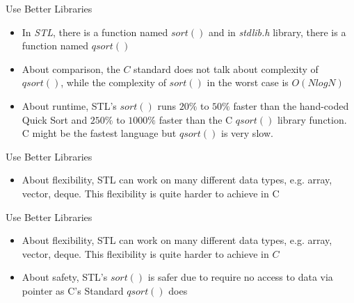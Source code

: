 \documentclass[aspectratio=169,xcolor=dvipsnames]{beamer}
\begin{document}
\begin{frame}{Use Better Libraries}
    \begin{itemize}
        \item In \textit{STL}, there is a function named $sort()$ and in \textit{stdlib.h} library, there is a function named $qsort()$
        \item About comparison, the $C$ standard does not talk about complexity of $qsort()$, while the complexity of $sort()$ in the worst case is $O(NlogN)$
        \item About runtime, STL’s $sort()$ runs $20\%$ to $50\%$ faster than the hand-coded Quick Sort and $250\%$ to $1000\%$ faster than the C $qsort()$ library function. C might be the fastest language but $qsort()$ is very slow.
    \end{itemize}
\end{frame}
\begin{frame}{Use Better Libraries}
    \begin{itemize}
        \item About flexibility, STL can work on many different data types, e.g. array, vector, deque. This flexibility is quite harder to achieve in C
    \end{itemize}
\end{frame}
\begin{frame}{Use Better Libraries}
    \begin{itemize}
        \item About flexibility, STL can work on many different data types, e.g. array, vector, deque. This flexibility is quite harder to achieve in $C$
        \item About safety, STL's $sort()$ is safer due to require no access to data via pointer as C's Standard $qsort()$ does
    \end{itemize}
\end{frame}
\end{document}
